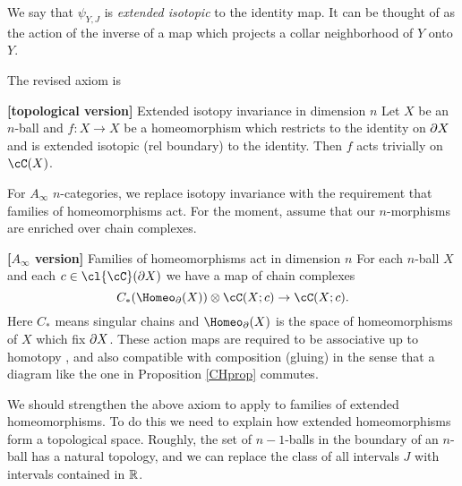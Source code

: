 We say that $\psi_{Y,J}$ is {\it extended isotopic} to the identity map.
It can be thought of as the action of the inverse of
a map which projects a collar neighborhood of $Y$ onto $Y$.

The revised axiom is

\addtocounter{axiom}{-1}
\begin{axiom}{\textup{\textbf{[topological  version]}} Extended isotopy invariance in dimension $n$}
\label{axiom:extended-isotopies}
Let $X$ be an $n$-ball and $f: X\to X$ be a homeomorphism which restricts
to the identity on $\partial X$ and is extended isotopic (rel boundary) to the identity.
Then $f$ acts trivially on $\cC(X)$.
\end{axiom}


\smallskip

For $A_\infty$ $n$-categories, we replace
isotopy invariance with the requirement that families of homeomorphisms act.
For the moment, assume that our $n$-morphisms are enriched over chain complexes.

\addtocounter{axiom}{-1}
\begin{axiom}{\textup{\textbf{[$A_\infty$ version]}} Families of homeomorphisms act in dimension $n$}
For each $n$-ball $X$ and each $c\in \cl{\cC}(\bd X)$ we have a map of chain complexes
\[
	C_*(\Homeo_\bd(X))\ot \cC(X; c) \to \cC(X; c) .
\]
Here $C_*$ means singular chains and $\Homeo_\bd(X)$ is the space of homeomorphisms of $X$
which fix $\partial X$.
These action maps are required to be associative up to homotopy
, and also compatible with composition (gluing) in the sense that
a diagram like the one in Proposition \ref{CHprop} commutes.
\end{axiom}

We should strengthen the above axiom to apply to families of extended homeomorphisms.
To do this we need to explain how extended homeomorphisms form a topological space.
Roughly, the set of $n{-}1$-balls in the boundary of an $n$-ball has a natural topology,
and we can replace the class of all intervals $J$ with intervals contained in $\mathbb{R}$.

